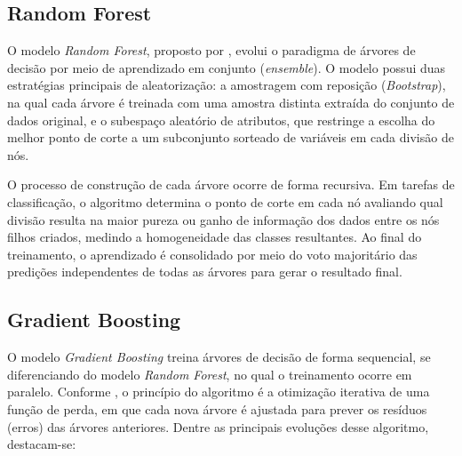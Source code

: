 \subsection{Random Forest}

O modelo \textit{Random Forest}, proposto por , evolui o paradigma de árvores de decisão por meio de aprendizado em conjunto (\textit{ensemble}). O modelo possui duas estratégias principais de aleatorização: a amostragem com reposição (\textit{Bootstrap}), na qual cada árvore é treinada com uma amostra distinta extraída do conjunto de dados original, e o subespaço aleatório de atributos, que restringe a escolha do melhor ponto de corte a um subconjunto sorteado de variáveis em cada divisão de nós. 

O processo de construção de cada árvore ocorre de forma recursiva. Em tarefas de classificação, o algoritmo determina o ponto de corte em cada nó avaliando qual divisão resulta na maior pureza ou ganho de informação dos dados entre os nós filhos criados, medindo a homogeneidade das classes resultantes. Ao final do treinamento, o aprendizado é consolidado por meio do voto majoritário das predições independentes de todas as árvores para gerar o resultado final.

\subsection{Gradient Boosting}

O modelo \textit{Gradient Boosting} treina árvores de decisão de forma sequencial, se diferenciando do modelo \textit{Random Forest}, no qual o treinamento ocorre em paralelo. Conforme , o princípio do algoritmo é a otimização iterativa de uma função de perda, em que cada nova árvore é ajustada para prever os resíduos (erros) das árvores anteriores. Dentre as principais evoluções desse algoritmo, destacam-se:

